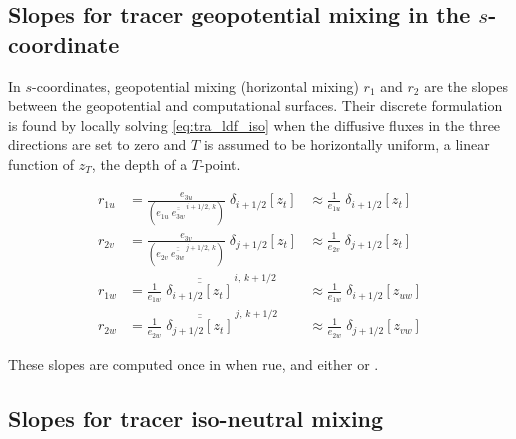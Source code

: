 \documentclass[../main/NEMO_manual]{subfiles}
\begin{document}

\subsection{Slopes for tracer geopotential mixing in the $s$-coordinate}

In $s$-coordinates, geopotential mixing (\ie horizontal mixing) $r_1$ and $r_2$ are the slopes between
the geopotential and computational surfaces.
Their discrete formulation is found by locally solving \autoref{eq:tra_ldf_iso} when
the diffusive fluxes in the three directions are set to zero and $T$ is assumed to be horizontally uniform,
\ie a linear function of $z_T$, the depth of a $T$-point. 

\begin{equation}
  \label{eq:ldfslp_geo}
  \begin{aligned}
    r_{1u} &= \frac{e_{3u}}{ \left( e_{1u}\;\overline{\overline{e_{3w}}}^{\,i+1/2,\,k} \right)}
    \;\delta_{i+1/2}[z_t]
    &\approx \frac{1}{e_{1u}}\; \delta_{i+1/2}[z_t] \ \ \ \\
    r_{2v} &= \frac{e_{3v}}{\left( e_{2v}\;\overline{\overline{e_{3w}}}^{\,j+1/2,\,k} \right)}
    \;\delta_{j+1/2} [z_t]
    &\approx \frac{1}{e_{2v}}\; \delta_{j+1/2}[z_t] \ \ \ \\
    r_{1w} &= \frac{1}{e_{1w}}\;\overline{\overline{\delta_{i+1/2}[z_t]}}^{\,i,\,k+1/2}
    &\approx \frac{1}{e_{1w}}\; \delta_{i+1/2}[z_{uw}]  \\
    r_{2w} &= \frac{1}{e_{2w}}\;\overline{\overline{\delta_{j+1/2}[z_t]}}^{\,j,\,k+1/2}
    &\approx \frac{1}{e_{2w}}\; \delta_{j+1/2}[z_{vw}]
  \end{aligned}
\end{equation}


These slopes are computed once in  when rue,
and either  or . 

\subsection{Slopes for tracer iso-neutral mixing}
\label{subsec:LDF_slp_iso}
\end{document}

